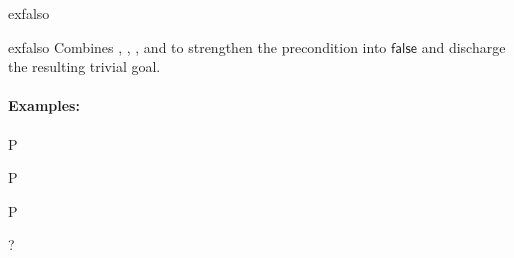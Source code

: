 \begin{tactic}{exfalso}
  \begin{tsyntax}{exfalso}
  Combines , , ,
   and  to strengthen the precondition
  into $\mathsf{false}$ and discharge the resulting trivial goal.

  \paragraph{Examples:}\strut
  
  \begin{cmathpar}
    {P \Rightarrow {}}
    {}

    {P \Rightarrow {}}
    {}

    {P \Rightarrow {}}
    {}
  \end{cmathpar}
  ?
  \end{tsyntax}
\end{tactic}
